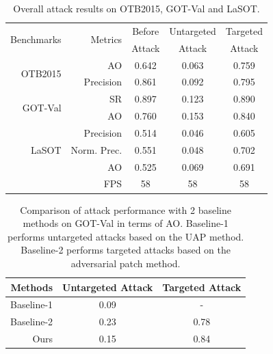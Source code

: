 \documentclass[journal]{IEEEtran}
\begin{document}
\begin{table}[t]
  \centering
  \caption{Overall attack results on OTB2015, GOT-Val and LaSOT.}
  \begin{tabular}{rrccc}
  \toprule
  \multirow{2}{*}{Benchmarks} & \multirow{2}{*}{Metrics} & Before    & Untargeted & Targeted  \\
                            &                         & Attack & Attack & Attack     \\ 
  \midrule
  \multirow{2}{*}{OTB2015} 
  & AO   & 0.642 & 0.063 & 0.759\\
  & Precision & 0.861 & 0.092 & 0.795\\
  \midrule
  \multirow{2}{*}{GOT-Val} 
  & SR & 0.897 & 0.123 & 0.890\\
  & AO & 0.760 & 0.153 & 0.840 \\
  \midrule
  \multirow{3}{*}{LaSOT} 
  & Precision  & 0.514 & 0.046 & 0.605\\
  & Norm. Prec.& 0.551 & 0.048 & 0.702\\
  & AO         & 0.525 & 0.069 & 0.691\\
  \midrule
  \multicolumn{2}{r}{FPS} & 58 & 58 & 58\\
  \bottomrule
  \end{tabular}
  \label{tab:benchmark results}
  \vspace{-3mm}
\end{table}
\begin{table}[t]
  \centering
  \caption{Comparison of attack performance with 2 baseline methods on GOT-Val in terms of AO. Baseline-1 performs untargeted attacks based on the UAP \cite{UAP} method. Baseline-2 performs targeted attacks based on the adversarial patch \cite{patch} method.}
  \begin{tabular}{@{}rcc@{}}
  \toprule
  Methods & Untargeted Attack & Targeted Attack \\ \midrule
  Baseline-1 \cite{UAP}  & 0.09          & -\\
  Baseline-2 \cite{patch}   & 0.23       & 0.78\\
  Ours & 0.15       & 0.84\\ \bottomrule
  \end{tabular}
  \label{tab:imperceptible}
\end{table}
\end{document}
